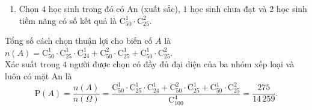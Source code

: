 \begin{ex}
{\begin{itemchoice}
\begin{enumerate}[\it TH 1:]
				\item Chọn $4$ học sinh trong đó có An (xuất sắc), $1$ học sinh chưa đạt và $2$ học sinh tiềm năng có số kết quả là $\mathrm{C}_{50}^1 \cdot \mathrm{C}_{25}^2$.
			\end{enumerate}
			Tổng số cách chọn thuận lợi cho biến cố $A$ là $n(A) = \mathrm{C}_{50}^1 \cdot \mathrm{C}_{25}^1 \cdot \mathrm{C}_{24}^1 + \mathrm{C}_{50}^2 \cdot \mathrm{C}_{25}^1 + \mathrm{C}_{50}^1 \cdot \mathrm{C}_{25}^2$.\\
			Xác suất trong $4$ người được chọn có đầy đủ đại diện của ba nhóm xếp loại và luôn có mặt An là
			\[\mathrm{P}(A) = \dfrac{n(A)}{n(\Omega)}= \dfrac{\mathrm{C}_{50}^1 \cdot \mathrm{C}_{25}^1 \cdot \mathrm{C}_{24}^1 + \mathrm{C}_{50}^2 \cdot \mathrm{C}_{25}^1 + \mathrm{C}_{50}^1 \cdot \mathrm{C}_{25}^2}{\mathrm{C}_{100}^4} = \dfrac{275}{14\,259}.\]
		\end{itemchoice}
	}
\end{ex}

